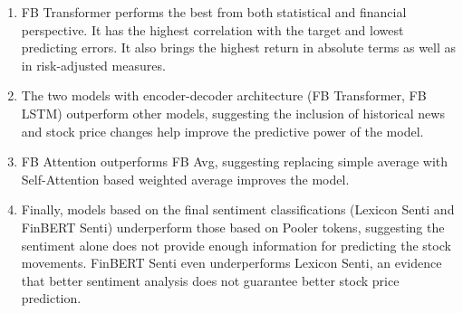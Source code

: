 \documentclass[11pt]{article}
\begin{document}
\begin{enumerate}
  \item FB Transformer performs the best from both statistical and financial perspective. It has the highest correlation with the target and lowest predicting errors. It also brings the highest return in absolute terms as well as in risk-adjusted measures.
  \item The two models with encoder-decoder architecture (FB Transformer, FB LSTM) outperform other models, suggesting the inclusion of historical news and stock price changes help improve the predictive power of the model.
  \item FB Attention outperforms FB Avg, suggesting replacing simple average with Self-Attention based weighted average improves the model.
  \item Finally, models based on the final sentiment classifications (Lexicon Senti and FinBERT Senti) underperform those based on Pooler tokens, suggesting the sentiment alone does not provide enough information for predicting the stock movements. FinBERT Senti even underperforms Lexicon Senti, an evidence that better sentiment analysis does not guarantee better stock price prediction.
\end{enumerate}
\end{document}
